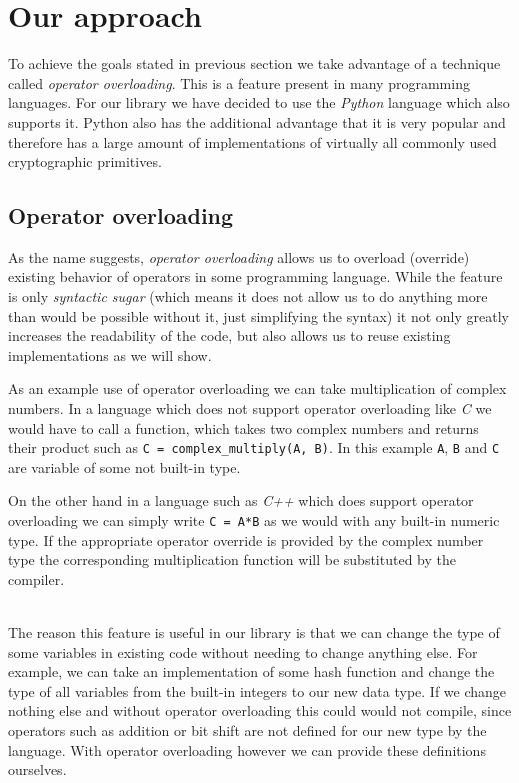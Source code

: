 \section{Our approach}
To achieve the goals stated in previous section we take advantage of a technique called \emph{operator overloading}.
This is a feature present in many programming languages.
For our library we have decided to use the \emph{Python} language which also supports it.
Python also has the additional advantage that it is very popular and therefore has a large amount of implementations of virtually all commonly used cryptographic primitives.

\subsection{Operator overloading}
As the name suggests, \emph{operator overloading} allows us to overload (override) existing behavior of operators in some programming language.
While the feature is only \emph{syntactic sugar} (which means it does not allow us to do anything more than would be possible without it, just simplifying the syntax) it not only greatly increases the readability of the code, but also allows us to reuse existing implementations as we will show.

As an example use of operator overloading we can take multiplication of complex numbers.
In a language which does not support operator overloading like \emph{C} we would have to call a function, which takes two complex numbers and returns their product such as \texttt{C = complex\_multiply(A, B)}.
In this example \texttt{A}, \texttt{B} and \texttt{C} are variable of some not built-in type.

On the other hand in a language such as \emph{C++} which does support operator overloading we can simply write \texttt{C = A*B} as we would with any built-in numeric type.
If the appropriate operator override is provided by the complex number type the corresponding multiplication function will be substituted by the compiler.

~\\

The reason this feature is useful in our library is that we can change the type of some variables in existing code without needing to change anything else.
For example, we can take an implementation of some hash function and change the type of all variables from the built-in integers to our new data type.
If we change nothing else and without operator overloading this could would not compile, since operators such as addition or bit shift are not defined for our new type by the language.
With operator overloading however we can provide these definitions ourselves.

